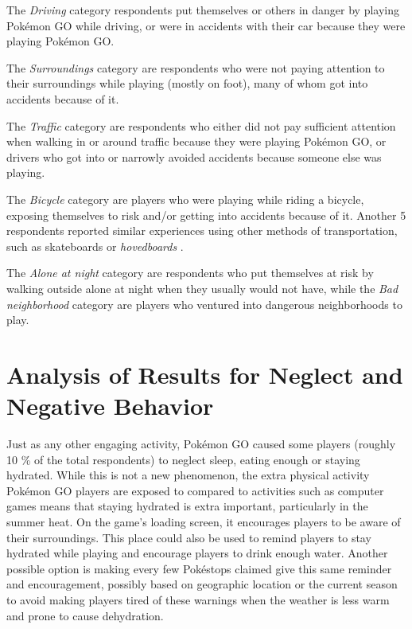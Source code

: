 The \emph{Driving} category respondents put themselves or others in danger by playing Pokémon GO while driving, or were in accidents with their car because they were playing Pokémon GO.

The \emph{Surroundings} category are respondents who were not paying attention to their surroundings while playing (mostly on foot), many of whom got into accidents because of it.

The \emph{Traffic} category are respondents who either did not pay sufficient attention when walking in or around traffic because they were playing Pokémon GO, or drivers who got into or narrowly avoided accidents because someone else was playing.

The \emph{Bicycle} category are players who were playing while riding a bicycle, exposing themselves to risk and/or getting into accidents because of it. Another 5 respondents reported similar experiences using other methods of transportation, such as skateboards or \emph{hovedboards} .

The \emph{Alone at night} category are respondents who put themselves at risk by walking outside alone at night when they usually would not have, while the \emph{Bad neighborhood} category are players who ventured into dangerous neighborhoods to play.

\section{Analysis of Results for Neglect and Negative Behavior}

Just as any other engaging activity, Pokémon GO caused some players (roughly 10 \% of the total respondents) to neglect sleep, eating enough or staying hydrated. While this is not a new phenomenon, the extra physical activity Pokémon GO players are exposed to compared to activities such as computer games means that staying hydrated is extra important, particularly in the summer heat. On the game's loading screen, it encourages players to be aware of their surroundings. This place could also be used to remind players to stay hydrated while playing and encourage players to drink enough water. Another possible option is making every few Pokéstops claimed give this same reminder and encouragement, possibly based on geographic location or the current season to avoid making players tired of these warnings when the weather is less warm and prone to cause dehydration.

